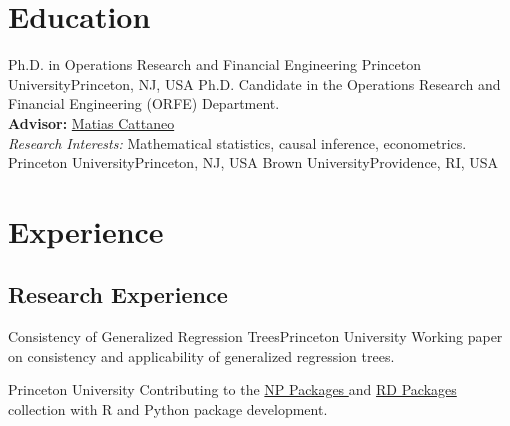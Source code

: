 \documentclass[10pt,a4paper,roman]{moderncv}        %
\begin{document}
\makecvtitle

\section{Education}
{Ph.D. in Operations Research and Financial Engineering}
{Princeton University}{Princeton, NJ, USA}{}
{Ph.D. Candidate in the Operations Research and Financial Engineering (ORFE) Department.\\
\textbf{Advisor: }\color{blue}\href{https://cattaneo.princeton.edu}{Matias Cattaneo}\color{black}\\
\textit{Research Interests:} Mathematical statistics, causal inference, econometrics.}
{Princeton University}{Princeton, NJ, USA}{}{}
{Brown University}{Providence, RI, USA}{}{}  %


\section{Experience}
\subsection{Research Experience}
{Consistency of Generalized Regression Trees}{Princeton University}{}
{Working paper on consistency and applicability of generalized regression trees.}

{Princeton University}{}
{Contributing to the \color{blue}\href{https://nppackages.github.io}{NP Packages
  }\color{black} and
  \color{blue}\href{https://rdpackages.github.io}{RD Packages }\color{black}
  collection with R and Python package development.}
\end{document}
